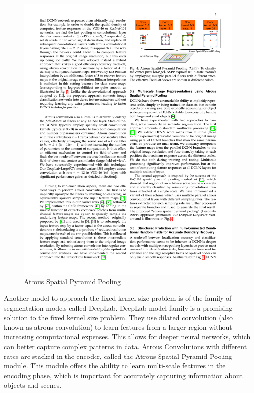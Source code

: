 \begin{figure}[h]
    \centering
    \includegraphics[width=\textwidth]{content/resources/new_images/related_works/aspp.pdf}
    \caption{Atrous Spatial Pyramid Pooling}
    \label{fig:unet}
\end{figure}

Another model to approach the fixed kernel size problem is of the family of segmentation models called DeepLab\cite{Deeplab}. DeepLab model family is a promising solution to the fixed kernel size problem. They use dilated convolution (also known as atrous convolution) to learn features from a larger region without increasing computational expenses. This allows for deeper neural networks, which can better capture complex patterns in data. Atrous Convolutions with different rates are stacked in the encoder, called the Atrous Spatial Pyramid Pooling module. This module offers the ability to learn multi-scale features in the encoding phase, which is important for accurately capturing information about objects and scenes.

